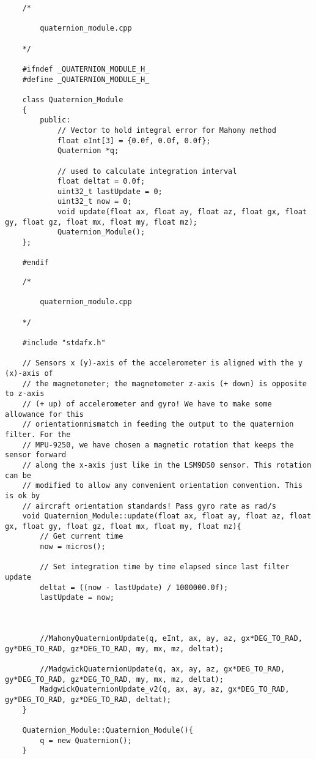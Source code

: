 	\begin{lstlisting}
	/*

		quaternion_module.cpp

	*/

	#ifndef _QUATERNION_MODULE_H_
	#define _QUATERNION_MODULE_H_

	class Quaternion_Module
	{
		public:
			// Vector to hold integral error for Mahony method
		    float eInt[3] = {0.0f, 0.0f, 0.0f};
		    Quaternion *q;

		    // used to calculate integration interval
		    float deltat = 0.0f;
	    	uint32_t lastUpdate = 0;
	    	uint32_t now = 0;
			void update(float ax, float ay, float az, float gx, float gy, float gz, float mx, float my, float mz);
			Quaternion_Module();
	};

	#endif
	\end{lstlisting}

	\begin{lstlisting}
	/*

		quaternion_module.cpp

	*/

	#include "stdafx.h"

	// Sensors x (y)-axis of the accelerometer is aligned with the y (x)-axis of
	// the magnetometer; the magnetometer z-axis (+ down) is opposite to z-axis
	// (+ up) of accelerometer and gyro! We have to make some allowance for this
	// orientationmismatch in feeding the output to the quaternion filter. For the
	// MPU-9250, we have chosen a magnetic rotation that keeps the sensor forward
	// along the x-axis just like in the LSM9DS0 sensor. This rotation can be
	// modified to allow any convenient orientation convention. This is ok by
	// aircraft orientation standards! Pass gyro rate as rad/s
	void Quaternion_Module::update(float ax, float ay, float az, float gx, float gy, float gz, float mx, float my, float mz){
		// Get current time
		now = micros();

		// Set integration time by time elapsed since last filter update
		deltat = ((now - lastUpdate) / 1000000.0f);
		lastUpdate = now;



		//MahonyQuaternionUpdate(q, eInt, ax, ay, az, gx*DEG_TO_RAD, gy*DEG_TO_RAD, gz*DEG_TO_RAD, my, mx, mz, deltat);

		//MadgwickQuaternionUpdate(q, ax, ay, az, gx*DEG_TO_RAD, gy*DEG_TO_RAD, gz*DEG_TO_RAD, my, mx, mz, deltat);
		MadgwickQuaternionUpdate_v2(q, ax, ay, az, gx*DEG_TO_RAD, gy*DEG_TO_RAD, gz*DEG_TO_RAD, deltat);
	}

	Quaternion_Module::Quaternion_Module(){
		q = new Quaternion();
	}

	\end{lstlisting}


